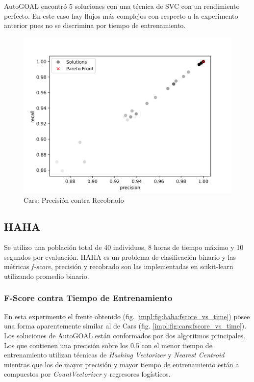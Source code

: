 AutoGOAL encontr\'o 5 soluciones con una t\'ecnica de SVC con un rendimiento perfecto. En este caso hay flujos m\'as complejos con respecto a la experimento anterior pues no se discrimina por tiempo de entrenamiento.

\begin{figure}[ht]
    \centering
    \includegraphics[scale=0.65]{Pictures/cars_precision_vs_recall.jpg}
    \caption{Cars: Precisi\'on contra Recobrado}
    \label{impl:fig:cars:precision_vs_recall}
\end{figure}

\subsection{HAHA}
Se utilizo una poblaci\'on total de 40 individuos, 8 horas de tiempo m\'aximo y 10 segundos por  evaluaci\'on. 
HAHA es un problema de clasificaci\'on binario y las m\'etricas \textit{f-score}, precisi\'on y recobrado son las implementadas en scikit-learn  utilizando promedio binario.

\subsubsection{F-Score contra Tiempo de Entrenamiento}

En esta experimento el frente obtenido (fig. \ref{impl:fig:haha:fscore_vs_time}) posee una forma aparentemente similar al de Cars (fig. \ref{impl:fig:cars:fscore_vs_time}). Los soluciones de AutoGOAL  est\'an conformados por dos algoritmos principales. Los que contienen una precisi\'on sobre los 0.5 con el menor tiempo de entrenamiento  utilizan t\'ecnicas de \textit{Hashing Vectorizer} y \textit{Nearest Centroid} mientras que los de mayor precisi\'on y mayor tiempo de entrenamiento est\'an a  compuestos por \textit{CountVectorizer}  y regresores log\'isticos.


